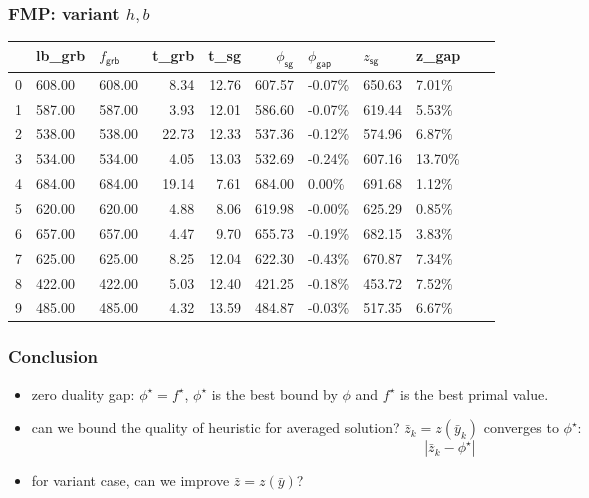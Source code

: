 \begin{frame}
  \frametitle{FMP: variant \(h, b\)}
  \scriptsize
  \begin{tabular}{lllrrrlllll}
    \toprule
    {} & lb\_grb              & \(f_{\textsf{grb}}\)   & t\_grb
       & t\_sg                & \(\phi_{\textsf{sg}}\) & \(\phi_{\textsf{gap}}\)
       & \( z_{\textsf{sg}}\) & z\_gap                                                                                         \\
    \midrule
    0  & 608.00               & 608.00                 & 8.34                    & 12.76 & 607.57 & -0.07\% & 650.63 & 7.01\%  \\
    1  & 587.00               & 587.00                 & 3.93                    & 12.01 & 586.60 & -0.07\% & 619.44 & 5.53\%  \\
    2  & 538.00               & 538.00                 & 22.73                   & 12.33 & 537.36 & -0.12\% & 574.96 & 6.87\%  \\
    3  & 534.00               & 534.00                 & 4.05                    & 13.03 & 532.69 & -0.24\% & 607.16 & 13.70\% \\
    4  & 684.00               & 684.00                 & 19.14                   & 7.61  & 684.00 & 0.00\%  & 691.68 & 1.12\%  \\
    5  & 620.00               & 620.00                 & 4.88                    & 8.06  & 619.98 & -0.00\% & 625.29 & 0.85\%  \\
    6  & 657.00               & 657.00                 & 4.47                    & 9.70  & 655.73 & -0.19\% & 682.15 & 3.83\%  \\
    7  & 625.00               & 625.00                 & 8.25                    & 12.04 & 622.30 & -0.43\% & 670.87 & 7.34\%  \\
    8  & 422.00               & 422.00                 & 5.03                    & 12.40 & 421.25 & -0.18\% & 453.72 & 7.52\%  \\
    9  & 485.00               & 485.00                 & 4.32                    & 13.59 & 484.87 & -0.03\% & 517.35 & 6.67\%  \\
    \bottomrule
  \end{tabular}
  \normalsize
\end{frame}

\begin{frame}
  \frametitle{Conclusion}

  \begin{itemize}
    \item zero duality gap: \(\phi^\star = f^\star\), \(\phi^\star\) is the best bound by \(\phi\) and \( f^\star\) is the best primal value.
    \item can we bound the quality of heuristic for averaged solution? \(\bar z_k = z(\bar y_k)\) converges to \(\phi^\star\):
          \[|\bar z_k - \phi^\star| \]
    \item for variant case, can we improve \(\bar z = z(\bar y)\)?
  \end{itemize}
\end{frame}


